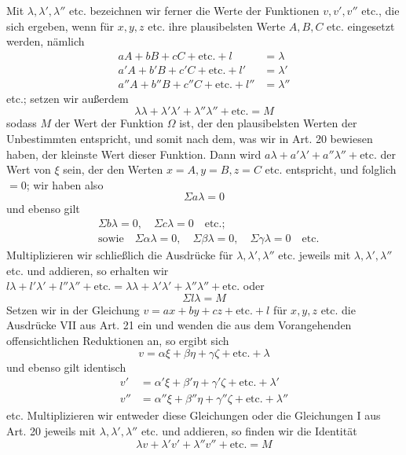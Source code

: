 Mit \(\lambda,\lambda',\lambda''\) etc. bezeichnen wir ferner die Werte der Funktionen \(v,v',v''\) etc., die sich ergeben, wenn für \(x,y,z\) etc. ihre plausibelsten Werte \(A,B,C\) etc. eingesetzt werden, nämlich
\[
\begin{aligned}
aA+bB+cC+\text{etc.}+l&=\lambda\\
a'A+b'B+c'C+\text{etc.}+l'&=\lambda'\\
a''A+b''B+c''C+\text{etc.}+l''&=\lambda''
\end{aligned}
\]
etc.; setzen wir außerdem
\[
\lambda\lambda+\lambda'\lambda'+\lambda''\lambda''+\text{etc.}=M
\]
sodass \(M\) der Wert der Funktion \(\Omega\) ist, der den plausibelsten Werten der Unbestimmten entspricht, und somit nach dem, was wir in Art. 20 bewiesen haben, der kleinste Wert dieser Funktion. Dann wird \(a\lambda+a'\lambda'+a''\lambda''+\text{etc.}\) der Wert von \(\xi\) sein, der den Werten \(x=A,\allowbreak y=B,\allowbreak z=C\) etc. entspricht, und folglich \(=0\); wir haben also
\[
\Sigma a\lambda=0
\]
und ebenso gilt
\[
\begin{aligned}
&\Sigma b\lambda=0,\quad\Sigma c\lambda=0\quad\text{etc.;}\\
&\text{sowie}\quad\Sigma\alpha\lambda=0,\quad\Sigma\beta\lambda=0,\quad\Sigma\gamma\lambda=0\quad\text{etc.}
\end{aligned}
\]
Multiplizieren wir schließlich die Ausdrücke für \(\lambda,\lambda',\lambda''\) etc. jeweils mit \(\lambda,\lambda',\lambda''\) etc. und addieren, so erhalten wir \(l\lambda+l'\lambda'+l''\lambda''+\text{etc.}=\lambda\lambda+\lambda'\lambda'+\lambda''\lambda''+\text{etc.}\) oder
\[
\Sigma l\lambda=M
\]
Setzen wir in der Gleichung \(v=ax+by+cz+\text{etc.}+l\) für \(x,y,z\) etc. die Ausdrücke VII aus Art. 21 ein und wenden die aus dem Vorangehenden offensichtlichen Reduktionen an, so ergibt sich
\[
v=\alpha\xi+\beta\eta+\gamma\zeta+\text{etc.}+\lambda
\]
und ebenso gilt identisch
\[
\begin{aligned}
v'&=\alpha'\xi+\beta'\eta+\gamma'\zeta+\text{etc.}+\lambda'\\
v''&=\alpha''\xi+\beta''\eta+\gamma''\zeta+\text{etc.}+\lambda''
\end{aligned}
\]
etc. Multiplizieren wir entweder diese Gleichungen oder die Gleichungen I aus Art. 20 jeweils mit \(\lambda,\lambda',\lambda''\) etc. und addieren, so finden wir die Identität
\[
\lambda v+\lambda'v'+\lambda''v''+\text{etc.}=M
\]
\clearpage

